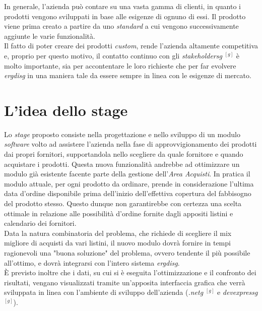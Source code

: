 \noindent In generale, l'azienda può contare su una vasta gamma di clienti,
in quanto i prodotti vengono sviluppati in base alle esigenze di ognuno di essi.
Il prodotto viene prima creato a partire da uno \textit{standard}
a cui vengono successivamente aggiunte le varie funzionalità.\\
Il fatto di poter creare dei prodotti \textit{custom}, rende l'azienda altamente competitiva
e, proprio per questo motivo, il contatto
continuo con gli \textit{\gls{stakeholdersg}} $^{[g]}$ è molto importante, sia per accontentare le loro richieste che per
far evolvere \textit{\gls{ergdisg}} in una maniera tale da essere sempre in linea con le esigenze di mercato.


\section{L'idea dello stage}
\noindent Lo \textit{stage} proposto consiste nella progettazione e nello sviluppo di un modulo \textit{software} volto
ad assistere l'azienda nella fase di approvvigionamento dei prodotti dai propri fornitori, supportandola nello scegliere
da quale fornitore e quando acquistare i prodotti.
\noindent Questa nuova funzionalità andrebbe ad ottimizzare un modulo già esistente facente parte della
gestione dell'\textit{Area Acquisti}.
In pratica il modulo attuale, per ogni prodotto da ordinare, prende in considerazione l'ultima data d'ordine disponibile prima dell'inizio
dell'effettiva copertura del fabbisogno del prodotto stesso. Questo dunque non garantirebbe con certezza una scelta ottimale
in relazione alle possibilità d'ordine fornite dagli appositi listini e calendario dei fornitori.\\

\noindent Data la natura combinatoria del problema, che richiede di scegliere il mix migliore di acquisti da vari listini, il nuovo modulo dovrà fornire in tempi ragionevoli una "buona soluzione"
del problema, ovvero tendente il più possibile all'ottimo, e dovrà integrarsi con l'intero sistema \textit{\gls{ergdisg}}.\\

\noindent È previsto inoltre che i dati, su cui si è eseguita l'ottimizzazione e il confronto dei risultati, vengano visualizzati tramite un'apposita
interfaccia grafica che verrà sviluppata in linea con l'ambiente di sviluppo dell'azienda (\textit{\gls{.netg}} $^{[g]}$ e \textit{\gls{devexpressg}} $^{[g]}$).


